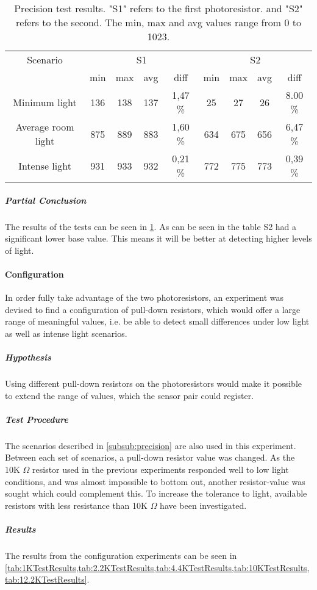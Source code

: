   \begin{table}[htbp]
    \centering
    \begin{tabular}{c c c c c c c c c}
      \toprule
      Scenario & \multicolumn{4}{c}{S1} & \multicolumn{4}{c}{S2} \\
      \cmidrule(rl){2-5} 
      \cmidrule(rl){6-9}
       & min & max & avg & diff & min & max & avg & diff \\ \midrule
      Minimum light & 136 & 138 & 137 & 1,47 \% & 25 & 27 & 26 & 8.00 \% \\
      Average room light & 875 & 889 & 883 & 1,60 \%  & 634 & 675 & 656 & 6,47 \% \\
      Intense light & 931 & 933 & 932 & 0,21 \%  & 772 & 775 & 773 & 0,39 \% \\ \bottomrule
    \end{tabular}
    \caption{Precision test results. "S1" refers to the first photoresistor. and
      "S2" refers to the second. The min, max and avg values range from 0 to 1023.}\label{tab:precisionTestResults}
  \end{table}

\subparagraph{Partial Conclusion}
The results of the tests can be seen in \cref{tab:precisionTestResults}. As can be seen in the table S2 had a significant lower base value. This means it will be better at detecting higher levels of light.

\paragraph{Configuration}
In order fully take advantage of the two photoresistors, an experiment was devised to find a configuration of pull-down resistors, which would offer a large range of meaningful values, i.e. be able to detect small differences under low light as well as intense light scenarios.
\subparagraph{Hypothesis}
Using different pull-down resistors on the photoresistors would make it possible to extend the range of values, which the sensor pair could register.
\subparagraph{Test Procedure}
The scenarios described in \cref{subsub:precision} are also used in this experiment. Between each set of scenarios, a pull-down resistor value was changed. As the 10K $\Omega$ resistor used in the previous experiments responded well to low light conditions, and was almost impossible to bottom out, another resistor-value was sought which could complement this. To increase the tolerance to light, available resistors with less resistance than 10K $\Omega$ have been investigated.
\subparagraph{Results}
The results from the configuration experiments can be seen in \cref{tab:1KTestResults,tab:2.2KTestResults,tab:4.4KTestResults,tab:10KTestResults,tab:12.2KTestResults}.

